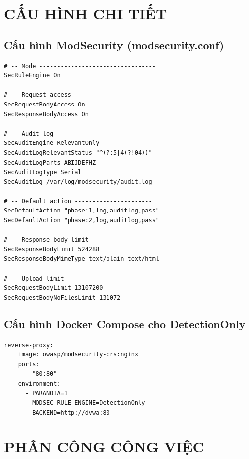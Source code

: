 \documentclass[12pt,a4paper,twoside]{report}
\begin{document}
\begin{appendices}

\chapter{CẤU HÌNH CHI TIẾT}

\section{Cấu hình ModSecurity (modsecurity.conf)}

\begin{lstlisting}[numbers=none,basicstyle=\footnotesize\ttfamily]
# -- Mode ---------------------------------
SecRuleEngine On

# -- Request access ----------------------
SecRequestBodyAccess On
SecResponseBodyAccess On

# -- Audit log --------------------------
SecAuditEngine RelevantOnly
SecAuditLogRelevantStatus "^(?:5|4(?!04))"
SecAuditLogParts ABIJDEFHZ
SecAuditLogType Serial
SecAuditLog /var/log/modsecurity/audit.log

# -- Default action ----------------------
SecDefaultAction "phase:1,log,auditlog,pass"
SecDefaultAction "phase:2,log,auditlog,pass"

# -- Response body limit -----------------
SecResponseBodyLimit 524288
SecResponseBodyMimeType text/plain text/html

# -- Upload limit ------------------------
SecRequestBodyLimit 13107200
SecRequestBodyNoFilesLimit 131072
\end{lstlisting}

\section{Cấu hình Docker Compose cho DetectionOnly}

\begin{lstlisting}[numbers=none]
  reverse-proxy:
    image: owasp/modsecurity-crs:nginx
    ports:
      - "80:80"
    environment:
      - PARANOIA=1
      - MODSEC_RULE_ENGINE=DetectionOnly
      - BACKEND=http://dvwa:80
\end{lstlisting}

\chapter{PHÂN CÔNG CÔNG VIỆC}


\end{appendices}
\end{document}
